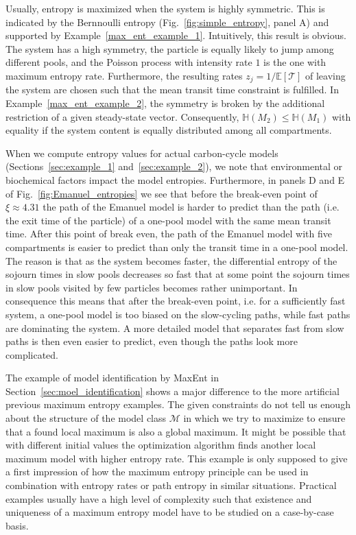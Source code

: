 \documentclass[smallextended]{svjour3}
\newcommand{\E}{\mathbb{E}}
\newcommand{\TT}{\mathcal{T}}
\renewcommand{\H}{\mathbb{H}}
\begin{document}
Usually, entropy is maximized when the system is highly symmetric.
This is indicated by the Bernnoulli entropy (Fig.~\ref{fig:simple_entropy}, panel A) and supported by Example~\ref{max_ent_example_1}.
Intuitively, this result is obvious.
The system has a high symmetry, the particle is equally likely to jump among different pools, and the Poisson process with intensity rate $1$ is the one with maximum entropy rate.
Furthermore, the resulting rates $z_j = 1/\E\left[\TT\right]$ of leaving the system are chosen such that the mean transit time constraint is fulfilled. 
In Example~\ref{max_ent_example_2}, the symmetry is broken by the additional restriction of a given steady-state vector.
Consequently, $\H(M_2) \leq \H(M_1)$ with equality if the system content is equally distributed among all compartments.

When we compute entropy values for actual carbon-cycle models (Sections~\ref{sec:example_1} and~\ref{sec:example_2}), we note that environmental or biochemical factors impact the model entropies.
Furthermore, in panels D and E of Fig.~\ref{fig:Emanuel_entropies} we see that before the break-even point of $\xi\approx4.31$ the path of the Emanuel model is harder to predict than the path (i.e. the exit time of the particle) of a one-pool model with the same mean transit time.
After this point of break even, the path of the Emanuel model with five compartments is easier to predict than only the transit time in a one-pool model.
The reason is that as the system becomes faster, the differential entropy of the sojourn times in slow pools decreases so fast that at some point the sojourn times in slow pools visited by few particles becomes rather unimportant.
In consequence this means that after the break-even point, i.e. for a sufficiently fast system, a one-pool model is too biased on the slow-cycling paths, while fast paths are dominating the system.
A more detailed model that separates fast from slow paths is then even easier to predict, even though the paths look more complicated.

The example of model identification by MaxEnt in Section~\ref{sec:moel_identification} shows a major difference to the more artificial previous maximum entropy examples.
The given constraints do not tell us enough about the structure of the model class $\mathcal{M}$ in which we try to maximize to ensure that a found local maximum is also a global maximum.
It might be possible that with different initial values the optimization algorithm finds another local maximum model with higher entropy rate.
This example is only supposed to give a first impression of how the maximum entropy principle can be used in combination with entropy rates or path entropy in similar situations.
Practical examples usually have a high level of complexity such that existence and uniqueness of a maximum entropy model have to be studied on a case-by-case basis.
\end{document}
